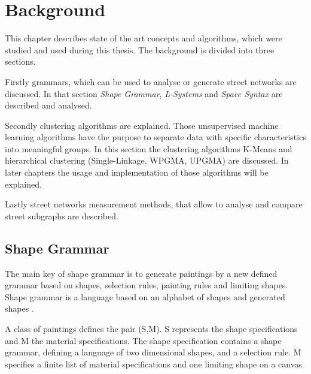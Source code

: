 \chapter{Background}
This chapter describes state of the art concepts and algorithms, which were studied and used during this thesis. The background is divided into three sections.

Firstly grammars, which can be used to analyse or generate street networks are discussed. In that section \textit{Shape Grammar}, \textit{L-Systems} and \textit{Space Syntax} are described and analysed.

Secondly clustering algorithms are explained. Those unsupervised machine learning algorithms have the purpose to separate data with specific characteristics into meaningful groups. In this section the clustering algorithms K-Means and hierarchical clustering (Single-Linkage, WPGMA, UPGMA) are discussed. In later chapters the usage and implementation of those algorithms will be explained.

Lastly street networks measurement methods, that allow to analyse and compare street subgraphs are described.

\section{Shape Grammar} \label{sec:shape_grammar}
The main key of shape grammar is to generate paintings by a new defined grammar based on shapes, selection rules, painting rules and limiting shapes. Shape grammar is a language based on an alphabet of shapes and generated shapes \citep{shapeGrammars:1972}.

A class of paintings defines the pair (S,M). S represents the shape specifications and M the material specifications. The shape specification contains a shape grammar, defining a language of two dimensional shapes, and a selection rule. M specifies a finite list of material specifications and one limiting shape on a canvas.

